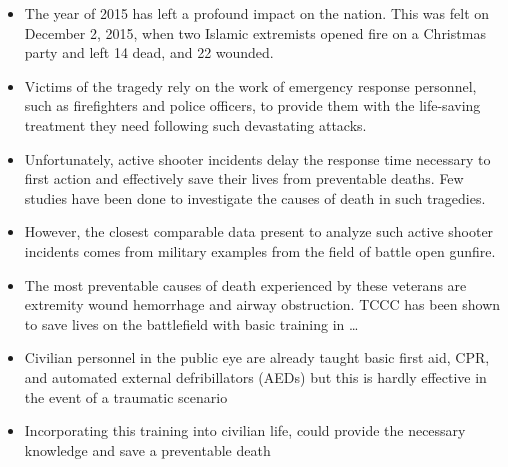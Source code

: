 \documentclass[]{article}
\author{Dylan Badin, Kevin Thompson}
\date{14-December-2015}
\begin{document}
\begin{itemize}
\itemsep1pt\parskip0pt
\item
  The year of 2015 has left a profound impact on the nation. This was
  felt on December 2, 2015, when two Islamic extremists opened fire on a
  Christmas party and left 14 dead, and 22 wounded.
\item
  Victims of the tragedy rely on the work of emergency response
  personnel, such as firefighters and police officers, to provide them
  with the life-saving treatment they need following such devastating
  attacks.
\item
  Unfortunately, active shooter incidents delay the response time
  necessary to first action and effectively save their lives from
  preventable deaths. Few studies have been done to investigate the
  causes of death in such tragedies.
\item
  However, the closest comparable data present to analyze such active
  shooter incidents comes from military examples from the field of
  battle open gunfire.
\item
  The most preventable causes of death experienced by these veterans are
  extremity wound hemorrhage and airway obstruction. TCCC has been shown
  to save lives on the battlefield with basic training in \ldots{}
\item
  Civilian personnel in the public eye are already taught basic first
  aid, CPR, and automated external defribillators (AEDs) but this is
  hardly effective in the event of a traumatic scenario
\item
  Incorporating this training into civilian life, could provide the
  necessary knowledge and save a preventable death
\end{itemize}
\end{document}

